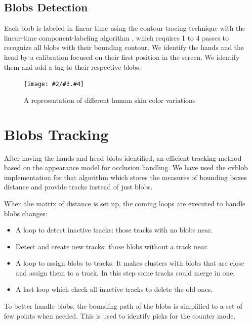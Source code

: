 \documentclass{llncs}
\newcommand{\imagepathext}[5]{%
\begin{figure}[!htbp]
\hfil\texttt{[image: \#2/\#3.\#4]}\hfil
\caption{#5\label{#3}}
\end{figure}}
\newcommand{\png}[2]{\imagepathext{width=\columnwidth}{pics}{#1}{png}{#2}}
\begin{document}
\subsection{Blobs Detection}
Each blob is labeled in linear time using the contour tracing technique with
the linear-time component-labeling algorithm \cite{CompLabeling},
which requires 1 to 4 passes to recognize all blobs with their bounding contour.
We identify the hands and the head by a calibration focused on their first
position in the screen. We identify them and add a tag to their respective blobs.

\png{skincolor}{A representation of different human skin color variations}

\section{Blobs Tracking}
After having the hands and head blobs identified, an efficient
tracking method based on the appearance model for occlusion handling\cite{app06}.
We have used the cvblob implementation \cite{cvblob} for that algorithm which 
stores the measures of bounding boxes distance and provide tracks instead of just blobs.  %

When the matrix of distance is set up, the coming loops
are executed to handle blobs changes:
\begin{itemize}
 \item A loop to detect inactive tracks: those tracks with no blobs near.
 \item Detect and create new tracks: those blobs without a track near.
 \item A loop to assign blobs to tracks. It makes clusters with blobs that are close and assign them to a track.
In this step some tracks could merge in one.
 \item A last loop which check all inactive tracks to delete the old ones.
\end{itemize}

To better handle blobs, the bounding path of the blobs
is simplified to a set of few points when needed.
This is used to identify picks for the counter mode.
\end{document}

